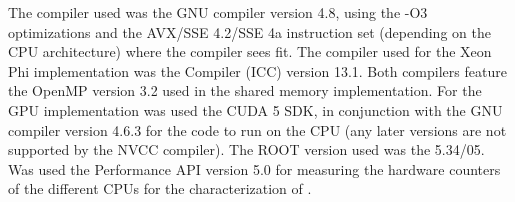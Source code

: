 The compiler used was the GNU compiler version 4.8, using the -O3 optimizations and the AVX/SSE 4.2/SSE 4a instruction set (depending on the CPU architecture) where the compiler sees fit. The compiler used for the \intel Xeon Phi implementation was the \intel Compiler (ICC) version 13.1. Both compilers feature the OpenMP version 3.2 used in the shared memory implementation. For the GPU implementation was used the CUDA 5 SDK, in conjunction with the GNU compiler version 4.6.3 for the code to run on the CPU (any later versions are not supported by the \nvidia NVCC compiler). The ROOT \cite{CERN:ROOT} version used was the 5.34/05. Was used the Performance API version 5.0 for measuring the hardware counters of the different CPUs for the characterization of \ttDilepKinFit.
